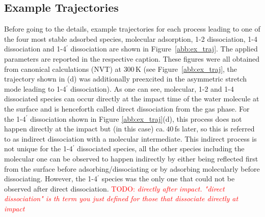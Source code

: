 \documentclass[11pt,DIV=13,BCOR=5mm,a4paper,headinclude]{scrbook}
\newcommand\todo[1]{\textcolor{red}{TODO: \textit{{#1}}}}
\begin{document}
\subsection{Example Trajectories}
Before going to the details, example trajectories for each process leading to one of the four most stable adsorbed species, molecular adsorption, 1-2 dissociation, 1-4 dissociation and 1-4$^\prime$ dissociation are shown in Figure~\ref{abb:ex_traj}.
The applied parameters are reported in the respective caption.
These figures were all obtained from canonical calculations (NVT) at $300\,$K (see Figure~\ref{abb:ex_traj}, the trajectory shown in (d) was additionally preexcited in the asymmetric stretch mode leading to 1-4$^\prime$ dissociation).
As one can see, molecular, 1-2 and 1-4 dissociated species can occur directly at the impact time of the water molecule at the surface and is henceforth called direct dissociation from the gas phase.
For the 1-4$^\prime$ dissociation shown in Figure \ref{abb:ex_traj}(d), this process does not happen directly at the impact but (in this case) ca.$~40\,$fs later, so this is referred to as indirect dissociation with a molecular intermediate.
This indirect process is not unique for the 1-4$^\prime$ dissociated species, all the other species including the molecular one can be observed to happen indirectly by either being reflected first from the surface before adsorbing/dissociating or by adsorbing molecularly before dissociating.
However, the 1-4$^\prime$ species was the only one that could not be observed after direct dissociation. \todo{directly after impact. "direct dissociation" is th term you just defined for those that dissociate directly at impact}
\end{document}
